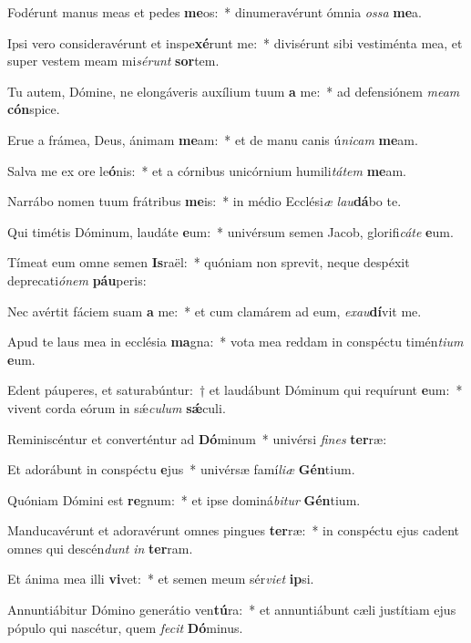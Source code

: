 \item Fodérunt manus meas et pedes \textbf{me}os:~* dinumeravérunt ómnia \textit{os}\textit{sa} \textbf{me}a.
\item Ipsi vero consideravérunt et inspe\textbf{xé}runt me:~* divisérunt sibi vestiménta mea, et super vestem meam mi\textit{sé}\textit{runt} \textbf{sor}tem.
\item Tu autem, Dómine, ne elongáveris auxílium tuum \textbf{a} me:~* ad defensiónem \textit{me}\textit{am} \textbf{cón}spice.
\item Erue a frámea, Deus, ánimam \textbf{me}am:~* et de manu canis ú\textit{ni}\textit{cam} \textbf{me}am.
\item Salva me ex ore le\textbf{ó}nis:~* et a córnibus unicórnium humili\textit{tá}\textit{tem} \textbf{me}am.
\item Narrábo nomen tuum frátribus \textbf{me}is:~* in médio Ecclési\textit{æ} \textit{lau}\textbf{dá}bo te.
\item Qui timétis Dóminum, laudáte \textbf{e}um:~* univérsum semen Jacob, glorifi\textit{cá}\textit{te} \textbf{e}um.
\item Tímeat eum omne semen \textbf{Is}raël:~* quóniam non sprevit, neque despéxit deprecati\textit{ó}\textit{nem} \textbf{páu}peris:
\item Nec avértit fáciem suam \textbf{a} me:~* et cum clamárem ad eum, \textit{ex}\textit{au}\textbf{dí}vit me.
\item Apud te laus mea in ecclésia \textbf{ma}gna:~* vota mea reddam in conspéctu timén\textit{ti}\textit{um} \textbf{e}um.
\item Edent páuperes, et saturabúntur:~† et laudábunt Dóminum qui requírunt \textbf{e}um:~* vivent corda eórum in sǽ\textit{cu}\textit{lum} \textbf{sǽ}culi.
\item Reminiscéntur et converténtur ad \textbf{Dó}minum~* univérsi \textit{fi}\textit{nes} \textbf{ter}ræ:
\item Et adorábunt in conspéctu \textbf{e}jus~* univérsæ famí\textit{li}\textit{æ} \textbf{Gén}tium.
\item Quóniam Dómini est \textbf{re}gnum:~* et ipse dominá\textit{bi}\textit{tur} \textbf{Gén}tium.
\item Manducavérunt et adoravérunt omnes pingues \textbf{ter}ræ:~* in conspéctu ejus cadent omnes qui descén\textit{dunt} \textit{in} \textbf{ter}ram.
\item Et ánima mea illi \textbf{vi}vet:~* et semen meum sér\textit{vi}\textit{et} \textbf{ip}si.
\item Annuntiábitur Dómino generátio ven\textbf{tú}ra:~* et annuntiábunt cæli justítiam ejus pópulo qui nascétur, quem \textit{fe}\textit{cit} \textbf{Dó}minus.
